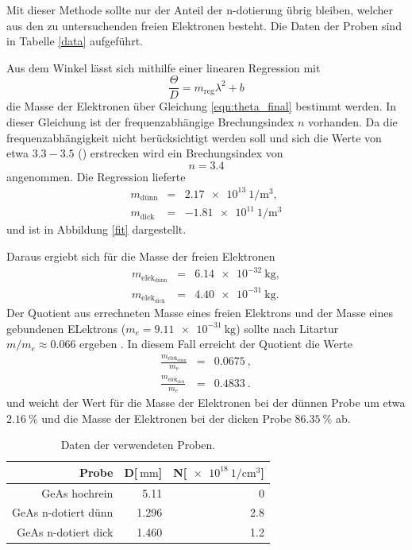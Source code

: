 Mit dieser Methode sollte nur der Anteil der n-dotierung übrig bleiben, welcher aus den zu untersuchenden freien Elektronen besteht.
Die Daten der Proben sind in Tabelle \ref{data} aufgeführt.

Aus dem Winkel lässt sich mithilfe einer linearen Regression mit
\begin{equation*}
	\frac{\Theta}{D} = m_\text{reg} \lambda^2 + b
\end{equation*}
die Masse der Elektronen über Gleichung \eqref{eqn:theta_final} bestimmt werden.
In dieser Gleichung ist der frequenzabhängige Brechungsindex $n$ vorhanden. Da die frequenzabhängigkeit nicht berücksichtigt werden soll und sich die Werte von etwa $3.3-3.5$ (\cite{GeAs}) erstrecken wird ein Brechungsindex von 
\begin{equation*}
	n = 3.4
\end{equation*}
angenommen.
Die Regression lieferte 
\begin{eqnarray*}
	m_\text{dünn} &=& \SI{2.17e13}{1\per\meter^3},\\
	m_\text{dick} &=& \SI{-1.81e11}{1\per\meter^3}
\end{eqnarray*}
und ist in Abbildung \ref{fit} dargestellt.

Daraus ergiebt sich für die Masse der freien Elektronen
\begin{eqnarray*}
	m_{\text{elek}_\text{dünn}} &=& \SI{6.14e-32}{\kilogram},\\
	m_{\text{elek}_\text{dick}} &=& \SI{4.40e-31}{\kilogram}.
\end{eqnarray*}
Der Quotient aus errechneten Masse eines freien Elektrons und der Masse eines gebundenen ELektrons ($m_e = \SI{9.11e-31}{\kilogram}$) sollte nach Litartur $m/m_e \approx 0.066$ ergeben \cite{kittel}.
In diesem Fall erreicht der Quotient die Werte
\begin{eqnarray*}
	\frac{m_{\text{elek}_\text{dünn}}}{m_\text{e}} &=& \SI{0.0675}{},\\
	\frac{m_{\text{elek}_\text{dick}}}{m_\text{e}} &=& \SI{0.4833}{}.
\end{eqnarray*}
und weicht der Wert für die Masse der Elektronen bei der dünnen Probe um etwa $\SI{2.16}{\percent}$ und die Masse der Elektronen bei der dicken Probe $\SI{86.35}{\percent}$ ab.

\begin{table}
	\centering
	\caption{Daten der verwendeten Proben.}
	\begin{tabular}{r r r}
	\toprule
		Probe & D[$\SI{}{\milli\meter}$]& N[$\SI{e18}{1\per\centi\meter^3}$]\\ 
		\midrule
		GeAs hochrein & 5.11 & 0\\
		GeAs n-dotiert dünn & 1.296 & 2.8\\
		GeAs n-dotiert dick & 1.460 & 1.2\\
	\end{tabular}
\end{table}


